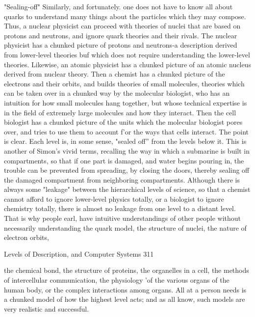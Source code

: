                                               "Sealing-off"
       Similarly, and fortunately. one does not have to know all about quarks to
       understand many things about the particles which they may compose. Thus, a
       nuclear physicist can proceed with theories of nuclei that are based on protons and
       neutrons, and ignore quark theories and their rivals. The nuclear physicist has a
       chunked picture of protons and neutrons-a description derived from lower-level
       theories buf which does not require understanding the lower-level theories.
       Likewise, an atomic physicist has a chunked picture of an atomic nucleus derived
       from nuclear theory. Then a chemist has a chunked picture of the electrons and
       their orbits, and builds theories of small molecules, theories which can be taken
       over in a chunked way by the molecular biologist, who has an intuition for how
       small molecules hang together, but whose technical expertise is in the field of
       extremely large molecules and how they interact. Then the cell biologist has a
       chunked picture of the units which the molecular biologist pores over, and tries to
       use them to account f'or the ways that cells interact. The point is clear. Each level
       is, in some sense, "sealed off'' from the levels below it. This is another of Simon's
       vivid terms, recalling the way in which a submarine is built in compartments, so
       that if one part is damaged, and water begins pouring in, the trouble can be
       prevented from spreading, by closing the doors, thereby sealing off the damaged
       compartment from neighboring compartments.
                Although there is always some "leakage" between the hierarchical levels
       of science, so that a chemist cannot afford to ignore lower-level physics totally, or
       a biologist to ignore chemistry totally, there is almost no leakage from one level
       to a distant level. That is why people earl, have intuitive understandings of other
       people without necessarily understanding the quark model, the structure of nuclei,
       the nature of electron orbits,




Levels of Description, and Computer Systems                                               311

       the chemical bond, the structure of proteins, the organelles in a cell, the methods
       of intercellular communication, the physiology 'of the various organs of the
       human body, or the complex interactions among organs. All at a person needs is a
       chunked model of how the highest level acts; and as all know, such models are
       very realistic and successful.

